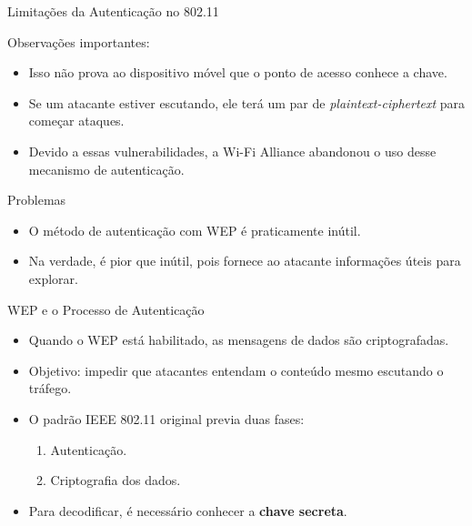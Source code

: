 \begin{frame}{Limitações da Autenticação no 802.11}

    \begin{block}{Observações importantes:}
        \begin{itemize}
            \item Isso não prova ao dispositivo móvel que o ponto de acesso conhece a chave.
            \item Se um atacante estiver escutando, ele terá um par de \textit{plaintext-ciphertext} para começar ataques.
            \item Devido a essas vulnerabilidades, a Wi-Fi Alliance abandonou o uso desse mecanismo de autenticação.
        \end{itemize}
    \end{block}

    \begin{block}{Problemas}
        \begin{itemize}
            \item O método de autenticação com WEP é praticamente inútil.
            \item Na verdade, é pior que inútil, pois fornece ao atacante informações úteis para explorar.
        \end{itemize}
    \end{block}


\end{frame}


\begin{frame}{WEP e o Processo de Autenticação}
    \begin{itemize}
        \item Quando o WEP está habilitado, as mensagens de dados são criptografadas.
        \item Objetivo: impedir que atacantes entendam o conteúdo mesmo escutando o tráfego.
        \item O padrão IEEE 802.11 original previa duas fases:
              \begin{enumerate}
                  \item Autenticação.
                  \item Criptografia dos dados.
              \end{enumerate}
        \item Para decodificar, é necessário conhecer a \textbf{chave secreta}.
    \end{itemize}
\end{frame}

